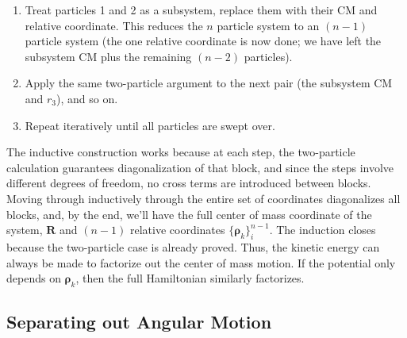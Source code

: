 \begin{enumerate}
    \item Treat particles 1 and 2 as a subsystem, replace them with their CM and relative coordinate. This reduces the $n$ particle system to an $(n-1)$ particle system (the one relative coordinate is now done; we have left the subsystem CM plus the remaining $(n-2)$ particles).
    \item Apply the same two-particle argument to the next pair (the subsystem CM and $r_3$), and so on.
    \item Repeat iteratively until all particles are swept over.
\end{enumerate}
The inductive construction works because at each step, the two-particle calculation guarantees diagonalization of that block, and since the steps involve different degrees of freedom, no cross terms are introduced between blocks. Moving through inductively through the entire set of coordinates diagonalizes all blocks, and, by the end, we'll have the full center of mass coordinate of the system, $\mathbf{R}$ and $(n-1)$ relative coordinates $\{\mathbf{\rho}_k\}_i^{n-1}$. The induction closes because the two-particle case is already proved. Thus, the kinetic energy can always be made to factorize out the center of mass motion. If the potential only depends on $\mathbf{\rho}_k$, then the full Hamiltonian similarly factorizes.




\subsection{Separating out Angular Motion}
